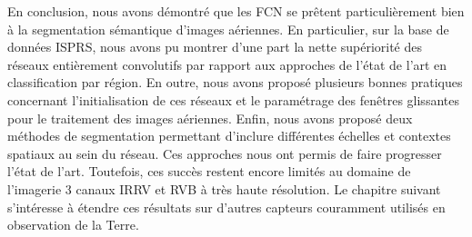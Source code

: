 En conclusion, nous avons démontré que les \gls{FCN} se prêtent particulièrement bien à la segmentation sémantique d'images aériennes. En particulier, sur la base de données \gls{ISPRS}, nous avons pu montrer d'une part la nette supériorité des réseaux entièrement convolutifs par rapport aux approches de l'état de l'art en classification par région. En outre, nous avons proposé plusieurs bonnes pratiques concernant l'initialisation de ces réseaux et le paramétrage des fenêtres glissantes pour le traitement des images aériennes. Enfin, nous avons proposé deux méthodes de segmentation permettant d'inclure différentes échelles et contextes spatiaux au sein du réseau. Ces approches nous ont permis de faire progresser l'état de l'art. Toutefois, ces succès restent encore limités au domaine de l'imagerie 3 canaux \gls{IRRV} et \gls{RVB} à très haute résolution. Le chapitre suivant s'intéresse à étendre ces résultats sur d'autres capteurs couramment utilisés en observation de la Terre.

%
%
\printbibliography[heading=subbibliography]
